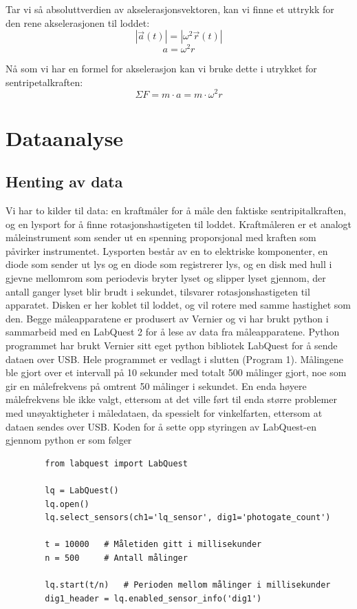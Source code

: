 \documentclass{article}
\begin{document}
Tar vi så absoluttverdien av akselerasjonsvektoren, kan vi finne et uttrykk for den rene akselerasjonen til loddet:
$$|\vec{a}(t)| = |\omega^2\vec{r}(t)|$$
$$a = \omega^2r$$

Nå som vi har en formel for akselerasjon kan vi bruke dette i utrykket for sentripetalkraften:
$$\Sigma F = m\cdot a = m\cdot \omega^2r$$

\section{Dataanalyse}
\subsection{Henting av data}
Vi har to kilder til data: en kraftmåler for å måle den faktiske sentripitalkraften, og en lysport for å finne rotasjonshastigeten til loddet.
Kraftmåleren er et analogt måleinstrument som sender ut en spenning proporsjonal med kraften som påvirker instrumentet. Lysporten består av en 
to elektriske komponenter, en diode som sender ut lys og en diode som registrerer lys, og en disk med hull i gjevne mellomrom som periodevis bryter 
lyset og slipper lyset gjennom, der antall ganger lyset blir brudt i sekundet, tilsvarer rotasjonshastigeten til apparatet. Disken er her koblet til 
loddet, og vil rotere med samme hastighet som den. Begge måleapparatene er produsert av Vernier og vi har brukt python i sammarbeid med en LabQuest 2 
for å lese av data fra måleapparatene. Python programmet har brukt Vernier sitt eget python bibliotek LabQuest for å sende dataen over USB. 
Hele programmet er vedlagt i slutten (Program 1). Målingene ble gjort over et intervall på 10 sekunder med totalt 500 målinger gjort, noe som gir en 
målefrekvens på omtrent 50 målinger i sekundet. En enda høyere målefrekvens ble ikke valgt, ettersom at det ville ført til enda større problemer med 
unøyaktigheter i måledataen, da spessielt for vinkelfarten, ettersom at dataen sendes over USB. Koden for å sette opp styringen av LabQuest-en gjennom 
python er som følger

\begin{Codesnippet}
    \begin{verbatim}
        from labquest import LabQuest

        lq = LabQuest()
        lq.open()
        lq.select_sensors(ch1='lq_sensor', dig1='photogate_count')

        t = 10000   # Måletiden gitt i millisekunder
        n = 500     # Antall målinger

        lq.start(t/n)   # Perioden mellom målinger i millisekunder
        dig1_header = lq.enabled_sensor_info('dig1')
    \end{verbatim}
\end{Codesnippet}
\end{document}
